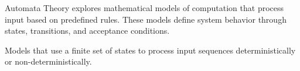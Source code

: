 \begin{NxSSBox}
	\begin{NxIDBox}
		Automata Theory explores mathematical models of computation that process input based on predefined rules. These models define system behavior through states, transitions, and acceptance conditions.
	\end{NxIDBox}
	\begin{NxIDBoxL}
		 Models that use a finite set of states to process input sequences deterministically or non-deterministically.
	\end{NxIDBoxL}
\end{NxSSBox}



